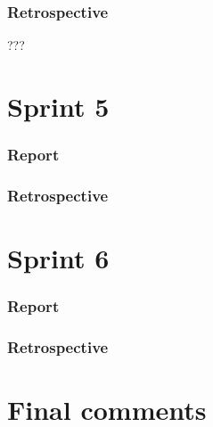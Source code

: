 \subsubsection{Retrospective}

???






\section{Sprint 5}

\subsubsection{Report}

\subsubsection{Retrospective}

\section{Sprint 6}

\subsubsection{Report}

\subsubsection{Retrospective}


\section{Final comments}